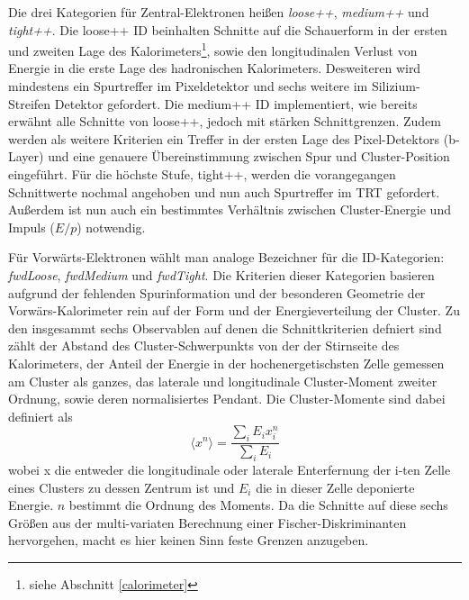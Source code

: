 Die drei Kategorien für Zentral-Elektronen heißen \textit{loose++},
\textit{medium++} und \textit{tight++}. Die loose++ ID beinhalten Schnitte auf
die Schauerform in der ersten und zweiten Lage des Kalorimeters\footnote{siehe
Abschnitt \ref{calorimeter}}, sowie den longitudinalen Verlust von Energie in
die erste Lage des hadronischen Kalorimeters. Desweiteren wird mindestens ein
Spurtreffer im Pixeldetektor und sechs weitere im Silizium-Streifen Detektor
gefordert. Die medium++ ID implementiert, wie bereits erwähnt alle Schnitte von
loose++, jedoch mit stärken Schnittgrenzen. Zudem werden als weitere Kriterien
ein Treffer in der ersten Lage des Pixel-Detektors (b-Layer) und eine genauere
Übereinstimmung zwischen Spur und Cluster-Position eingeführt. Für die höchste
Stufe, tight++, werden die vorangegangen Schnittwerte nochmal angehoben und nun
auch Spurtreffer im \ac{TRT} gefordert. Außerdem ist nun auch ein bestimmtes
Verhältnis zwischen Cluster-Energie und Impuls ($E/p$) notwendig.

Für Vorwärts-Elektronen wählt man analoge Bezeichner für die ID-Kategorien:
\linebreak
\textit{fwdLoose}, \textit{fwdMedium} und \textit{fwdTight}. Die Kriterien
dieser Kategorien basieren aufgrund der fehlenden Spurinformation und der
besonderen Geometrie der Vorwärs-Kalorimeter rein auf der Form und der
Energieverteilung der Cluster. Zu den insgesammt sechs Observablen auf denen
die Schnittkriterien defniert sind zählt der Abstand des Cluster-Schwerpunkts
von der der Stirnseite des Kalorimeters, der Anteil der Energie in der
hochenergetischsten Zelle gemessen am Cluster als ganzes, das laterale und
longitudinale Cluster-Moment zweiter Ordnung, sowie deren normalisiertes
Pendant. Die Cluster-Momente sind dabei definiert als
\begin{equation}
    \langle x^n \rangle = \frac{\sum_i E_i x_i^n}{\sum_i E_i}
\end{equation}
wobei x die entweder die longitudinale oder laterale Enterfernung der i-ten
Zelle eines Clusters zu dessen Zentrum ist und $E_i$ die in dieser Zelle
deponierte Energie. $n$ bestimmt die Ordnung des Moments. Da die Schnitte auf
diese sechs Größen aus der multi-variaten Berechnung einer
Fischer-Diskriminanten hervorgehen, macht es hier keinen Sinn feste Grenzen
anzugeben.

